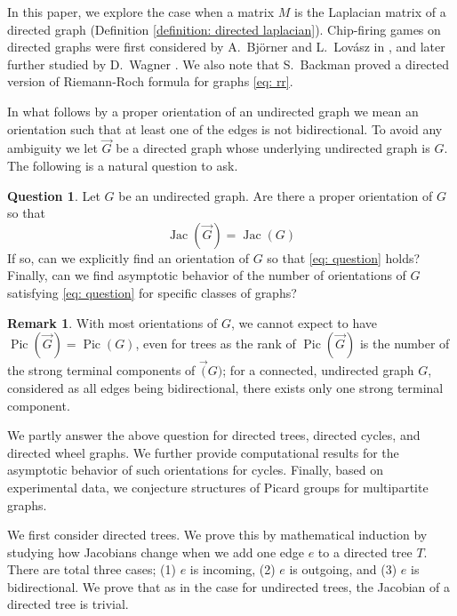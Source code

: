 \documentclass[11pt,reqno]{amsart}
\DeclareMathOperator{\Pic}{Pic}
\DeclareMathOperator{\Jac}{Jac}
\theoremstyle{definition}
\newtheorem{rmk}[mydef]{Remark}
\newtheorem*{que}{Question}
\theoremstyle{plain}
\begin{document}
In this paper, we explore the case when a matrix $M$ is the Laplacian matrix of a directed graph (Definition \ref{definition: directed laplacian}). Chip-firing games on directed graphs were first considered by A.~Bj\"orner and L.~Lov\'asz in \cite{bjorner1992chip}, and later further studied by D.~Wagner \cite{wagner2000critical}. We also note that S.~Backman \cite{backman2017riemann} proved a directed version of Riemann-Roch formula for graphs \eqref{eq: rr}. 

In what follows by a proper orientation of an undirected graph we mean an orientation such that at least one of the edges is not bidirectional. To avoid any ambiguity we let $\vec{G}$ be a directed graph whose underlying undirected graph is $G$. The following is a natural question to ask. 

\begin{que}\label{question: main question}
Let $G$ be an undirected graph. Are there a proper orientation of $G$ so that
\begin{equation}\label{eq: question}
\Jac(\vec{G})=\Jac(G)	
\end{equation}
If so, can we explicitly find an orientation of $G$ so that \eqref{eq: question} holds? Finally, can we find asymptotic behavior of the number of orientations of $G$ satisfying \eqref{eq: question} for specific classes of graphs?
\end{que}


\begin{rmk}
With most orientations of $G$, we cannot expect to have $\Pic(\vec{G})=\Pic(G)$, even for trees as the rank of $\Pic(\vec{G})$ is the number of the strong terminal components of $\vec(G)$; for a connected, undirected graph $G$, considered as all edges being bidirectional, there exists only one strong terminal component. 	
\end{rmk}

We partly answer the above question for directed trees, directed cycles, and directed wheel graphs. We further provide computational results for the asymptotic behavior of such orientations for cycles. Finally, based on experimental data, we conjecture structures of Picard groups for multipartite graphs. 



We first consider directed trees. We prove this by mathematical induction by studying how Jacobians change when we add one edge $e$ to a directed tree $T$. There are total three cases; (1) $e$ is incoming, (2) $e$ is outgoing, and (3) $e$ is bidirectional. We prove that as in the case for undirected trees, the Jacobian of a directed tree is trivial.
\end{document}
